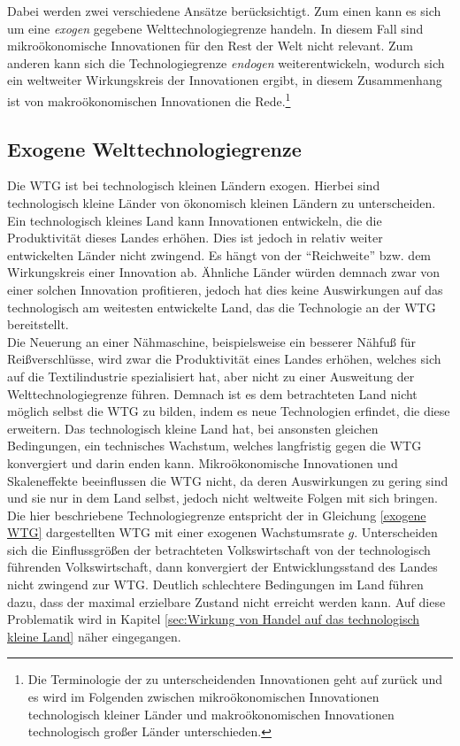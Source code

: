 Dabei werden zwei verschiedene Ansätze berücksichtigt. Zum einen kann es sich um eine \textsl{exogen} gegebene Welttechnologiegrenze handeln. In diesem Fall sind mikroökonomische Innovationen für den Rest der Welt nicht relevant. Zum anderen kann sich die Technologiegrenze \textsl{endogen} weiterentwickeln, wodurch sich ein weltweiter Wirkungskreis der Innovationen ergibt, in diesem Zusammenhang ist von makroökonomischen Innovationen die Rede.\footnote{Die Terminologie der zu unterscheidenden Innovationen geht auf \citet{Mokyr.1990} zurück und es wird im Folgenden zwischen mikroökonomischen Innovationen technologisch kleiner Länder und makroökonomischen Innovationen technologisch gro{\ss}er Länder unterschieden.}


\subsection{Exogene Welttechnologiegrenze}\label{sec:exogene WTG}
Die WTG ist bei technologisch kleinen Ländern exogen. Hierbei sind technologisch kleine Länder von ökonomisch kleinen Ländern zu unterscheiden. Ein technologisch kleines Land kann Innovationen entwickeln, die die Produktivität dieses Landes erhöhen. Dies ist jedoch in relativ weiter entwickelten Länder nicht zwingend. Es hängt von der "`Reichweite"' bzw. dem Wirkungskreis einer Innovation ab. Ähnliche Länder würden demnach zwar von einer solchen Innovation profitieren, jedoch hat dies keine Auswirkungen auf das technologisch am weitesten entwickelte Land, das die Technologie an der WTG bereitstellt.\\


Die Neuerung an einer Nähmaschine, beispielsweise ein besserer Nähfu{\ss} für Rei{\ss}verschlüsse, wird zwar die Produktivität eines Landes erhöhen, welches sich auf die Textilindustrie spezialisiert hat, aber nicht zu einer Ausweitung der Welttechnologiegrenze führen. Demnach ist es dem betrachteten Land nicht möglich selbst die WTG zu bilden, indem es neue Technologien erfindet, die diese erweitern. Das technologisch kleine Land hat, bei ansonsten gleichen Bedingungen, ein technisches Wachstum, welches langfristig gegen die WTG konvergiert und darin enden kann.
Mikroökonomische Innovationen und Skaleneffekte beeinflussen die WTG nicht, da deren Auswirkungen zu gering sind und sie nur in dem Land selbst, jedoch nicht weltweite Folgen mit sich bringen. Die hier beschriebene Technologiegrenze entspricht der in Gleichung \eqref{exogene WTG} dargestellten WTG mit einer exogenen Wachstumsrate $g$. 
Unterscheiden sich die Einflussgrö{\ss}en der betrachteten Volkswirtschaft von der technologisch führenden Volkswirtschaft, dann konvergiert der Entwicklungsstand des Landes nicht zwingend zur WTG. Deutlich schlechtere Bedingungen im Land führen dazu, dass der maximal erzielbare Zustand nicht erreicht werden kann. Auf diese Problematik wird in Kapitel \ref{sec:Wirkung von Handel auf das technologisch kleine Land} näher eingegangen. 


